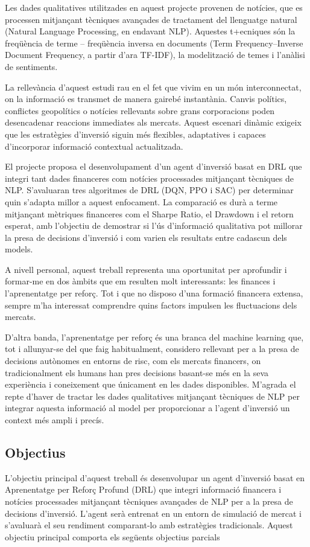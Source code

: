 \documentclass[12pt,a4paper,twoside]{book}
\begin{document}
Les dades qualitatives utilitzades en aquest projecte provenen de notícies, que es processen mitjançant tècniques avançades de tractament del llenguatge natural (Natural Language Processing, en endavant NLP). Aquestes t+ecniques són la freqüència de terme – freqüència inversa en documents (Term Frequency–Inverse Document Frequency, a partir d’ara TF-IDF), la modelització de temes i l’anàlisi de sentiments.

La rellevància d’aquest estudi rau en el fet que vivim en un món interconnectat, on la informació es transmet de manera gairebé instantània. Canvis polítics, conflictes geopolítics o notícies rellevants sobre grans corporacions poden desencadenar reaccions immediates als mercats. Aquest escenari dinàmic exigeix que les estratègies d’inversió siguin més flexibles, adaptatives i capaces d’incorporar informació contextual actualitzada.

El projecte proposa el desenvolupament d’un agent d’inversió basat en DRL que integri tant dades financeres com notícies processades mitjançant tècniques de NLP. S’avaluaran tres algoritmes de DRL (DQN, PPO i SAC) per determinar quin s’adapta millor a aquest enfocament. La comparació es durà a terme mitjançant mètriques financeres com el Sharpe Ratio, el Drawdown i el retorn esperat, amb l’objectiu de demostrar si l’ús d’informació qualitativa pot millorar la presa de decisions d’inversió i com varien els resultats entre cadascun dels models.

A nivell personal, aquest treball representa una oportunitat per aprofundir i formar-me en dos àmbits que em resulten molt interessants: les finances i l’aprenentatge per reforç. Tot i que no disposo d’una formació financera extensa, sempre m’ha interessat comprendre quins factors impulsen les fluctuacions dels mercats.

D’altra banda, l’aprenentatge per reforç és una branca del machine learning que, tot i allunyar-se del que faig habitualment, considero rellevant per a la presa de decisions autònomes en entorns de risc, com els mercats financers, on tradicionalment els humans han pres decisions basant-se més en la seva experiència i coneixement que únicament en les dades disponibles. M’agrada el repte d'haver de tractar les dades qualitatives mitjançant tècniques de NLP per integrar aquesta informació al model per proporcionar a l’agent d’inversió un context més ampli i precís.

\subsection{Objectius}
L'objectiu principal d'aquest treball és desenvolupar un agent d’inversió basat en Aprenentatge per Reforç Profund (DRL) que integri informació financera i notícies processades mitjançant tècniques avançades de NLP per a la presa de decisions d'inversió. L’agent serà entrenat en un entorn de simulació de mercat i s’avaluarà el seu rendiment comparant-lo amb estratègies tradicionals. Aquest objectiu principal comporta els següents objectius parcials
\end{document}
